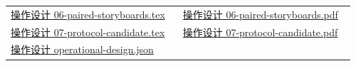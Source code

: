 \documentclass[11pt,a4paper]{article}
\begin{document}
\begin{minipage}{\linewidth}
\begin{tabular}{@{}p{0.48\linewidth}p{0.48\linewidth}@{}}
\href{file:///D:/Agent/srp/agent/design/design-foundation-20261008/06-paired-storyboards.tex}{操作设计 06-\allowbreak{}paired-\allowbreak{}storyboards.tex} & \href{file:///D:/Agent/srp/agent/design/design-foundation-20261008/06-paired-storyboards.pdf}{操作设计 06-\allowbreak{}paired-\allowbreak{}storyboards.pdf}\\[4pt]
\href{file:///D:/Agent/srp/agent/design/design-foundation-20261008/07-protocol-candidate.tex}{操作设计 07-\allowbreak{}protocol-\allowbreak{}candidate.tex} & \href{file:///D:/Agent/srp/agent/design/design-foundation-20261008/07-protocol-candidate.pdf}{操作设计 07-\allowbreak{}protocol-\allowbreak{}candidate.pdf}\\[4pt]
\href{file:///D:/Agent/srp/agent/design/design-foundation-20261008/operational-design.json}{操作设计 operational-\allowbreak{}design.json} & \\[4pt]
\end{tabular}\endgroup\end{minipage}\par
\end{document}

